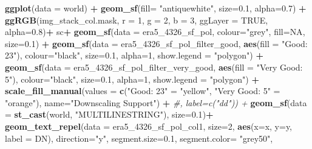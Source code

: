 \documentclass[12pt,twoside]{reedthesis}
\newenvironment{Shaded}{\begin{snugshade}}{\end{snugshade}}
\newcommand{\CommentTok}[1]{\textcolor[rgb]{0.56,0.35,0.01}{\textit{#1}}}
\newcommand{\DataTypeTok}[1]{\textcolor[rgb]{0.13,0.29,0.53}{#1}}
\newcommand{\DecValTok}[1]{\textcolor[rgb]{0.00,0.00,0.81}{#1}}
\newcommand{\FloatTok}[1]{\textcolor[rgb]{0.00,0.00,0.81}{#1}}
\newcommand{\KeywordTok}[1]{\textcolor[rgb]{0.13,0.29,0.53}{\textbf{#1}}}
\newcommand{\NormalTok}[1]{#1}
\newcommand{\OperatorTok}[1]{\textcolor[rgb]{0.81,0.36,0.00}{\textbf{#1}}}
\newcommand{\OtherTok}[1]{\textcolor[rgb]{0.56,0.35,0.01}{#1}}
\newcommand{\StringTok}[1]{\textcolor[rgb]{0.31,0.60,0.02}{#1}}
\begin{document}
\begin{Shaded}
\begin{Highlighting}[]
{{{{\KeywordTok{ggplot}\NormalTok{(}\DataTypeTok{data =}\NormalTok{ world) }\OperatorTok{+}\StringTok{ }
\StringTok{  }\KeywordTok{geom_sf}\NormalTok{(}\DataTypeTok{fill=} \StringTok{"antiquewhite"}\NormalTok{,  }\DataTypeTok{size=}\FloatTok{0.1}\NormalTok{, }\DataTypeTok{alpha=}\FloatTok{0.7}\NormalTok{) }\OperatorTok{+}\StringTok{ }
\StringTok{  }\KeywordTok{ggRGB}\NormalTok{(img_stack_col.mask, }\DataTypeTok{r =} \DecValTok{1}\NormalTok{, }\DataTypeTok{g =} \DecValTok{2}\NormalTok{, }\DataTypeTok{b =} \DecValTok{3}\NormalTok{, }\DataTypeTok{ggLayer =} \OtherTok{TRUE}\NormalTok{, }\DataTypeTok{alpha=}\FloatTok{0.8}\NormalTok{)}\OperatorTok{+}
\StringTok{  }\NormalTok{sc}\OperatorTok{+}
\StringTok{  }\KeywordTok{geom_sf}\NormalTok{(}\DataTypeTok{data =}\NormalTok{ era5_}\DecValTok{4326}\NormalTok{_sf_pol, }\DataTypeTok{colour=}\StringTok{"grey"}\NormalTok{, }\DataTypeTok{fill=}\OtherTok{NA}\NormalTok{, }\DataTypeTok{size=}\FloatTok{0.1}\NormalTok{) }\OperatorTok{+}\StringTok{ }
\StringTok{  }\KeywordTok{geom_sf}\NormalTok{(}\DataTypeTok{data =}\NormalTok{ era5_}\DecValTok{4326}\NormalTok{_sf_pol_filter_good, }\KeywordTok{aes}\NormalTok{(}\DataTypeTok{fill =} \StringTok{"Good: 23"}\NormalTok{), }\DataTypeTok{colour=}\StringTok{"black"}\NormalTok{, }\DataTypeTok{size=}\FloatTok{0.1}\NormalTok{, }\DataTypeTok{alpha=}\DecValTok{1}\NormalTok{, }\DataTypeTok{show.legend =} \StringTok{"polygon"}\NormalTok{) }\OperatorTok{+}
\StringTok{  }\KeywordTok{geom_sf}\NormalTok{(}\DataTypeTok{data =}\NormalTok{ era5_}\DecValTok{4326}\NormalTok{_sf_pol_filter_very_good, }\KeywordTok{aes}\NormalTok{(}\DataTypeTok{fill =} \StringTok{"Very Good: 5"}\NormalTok{), }\DataTypeTok{colour=}\StringTok{"black"}\NormalTok{, }\DataTypeTok{size=}\FloatTok{0.1}\NormalTok{, }\DataTypeTok{alpha=}\DecValTok{1}\NormalTok{, }\DataTypeTok{show.legend =} \StringTok{"polygon"}\NormalTok{) }\OperatorTok{+}
\StringTok{  }\KeywordTok{scale_fill_manual}\NormalTok{(}\DataTypeTok{values =} \KeywordTok{c}\NormalTok{(}\StringTok{"Good: 23"}\NormalTok{ =}\StringTok{ "yellow"}\NormalTok{, }\StringTok{"Very Good: 5"}\NormalTok{ =}\StringTok{ "orange"}\NormalTok{), }\DataTypeTok{name=}\StringTok{"Downscaling Support"}\NormalTok{) }\OperatorTok{+}\StringTok{ }\CommentTok{#, label=c("dd")) +  }
\StringTok{  }\KeywordTok{geom_sf}\NormalTok{(}\DataTypeTok{data =} \KeywordTok{st_cast}\NormalTok{(world, }\StringTok{"MULTILINESTRING"}\NormalTok{), }\DataTypeTok{size=}\FloatTok{0.1}\NormalTok{)}\OperatorTok{+}
\StringTok{  }\KeywordTok{geom_text_repel}\NormalTok{(}\DataTypeTok{data =}\NormalTok{ era5_}\DecValTok{4326}\NormalTok{_sf_pol_col1, }\DataTypeTok{size=}\DecValTok{2}\NormalTok{, }\KeywordTok{aes}\NormalTok{(}\DataTypeTok{x=}\NormalTok{x, }\DataTypeTok{y=}\NormalTok{y, }\DataTypeTok{label =}\NormalTok{ DN), }\DataTypeTok{direction=}\StringTok{"y"}\NormalTok{, }\DataTypeTok{segment.size=}\FloatTok{0.1}\NormalTok{, }\DataTypeTok{segment.color=} \StringTok{"grey50"}\NormalTok{, }
}}}}
\end{Highlighting}
\end{Shaded}
\end{document}
